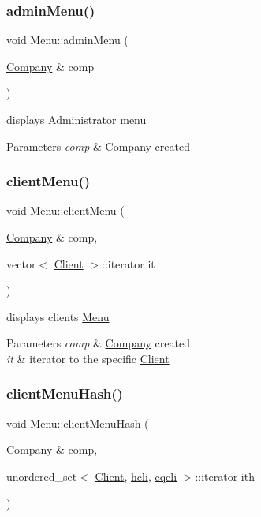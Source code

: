 \subsubsection{\texorpdfstring{admin\+Menu()}{adminMenu()}}
{\footnotesize\ttfamily void Menu\+::admin\+Menu (\begin{DoxyParamCaption}\item[{\hyperlink{class_company}{Company} \&}]{comp }\end{DoxyParamCaption})}



displays Administrator menu 


\begin{DoxyParams}{Parameters}
{\em comp} & \hyperlink{class_company}{Company} created \\
\hline
\end{DoxyParams}
\hypertarget{class_menu_a84baff6bb52d20d742d5d750fad6750d}{}\label{class_menu_a84baff6bb52d20d742d5d750fad6750d} 
\subsubsection{\texorpdfstring{client\+Menu()}{clientMenu()}}
{\footnotesize\ttfamily void Menu\+::client\+Menu (\begin{DoxyParamCaption}\item[{\hyperlink{class_company}{Company} \&}]{comp,  }\item[{vector$<$ \hyperlink{class_client}{Client} $>$\+::iterator}]{it }\end{DoxyParamCaption})}



displays clients \hyperlink{class_menu}{Menu} 


\begin{DoxyParams}{Parameters}
{\em comp} & \hyperlink{class_company}{Company} created\\
\hline
{\em it} & iterator to the specific \hyperlink{class_client}{Client} \\
\hline
\end{DoxyParams}
\hypertarget{class_menu_aa69e8ebe9ec9d077de45860e46a5fcbc}{}\label{class_menu_aa69e8ebe9ec9d077de45860e46a5fcbc} 
\subsubsection{\texorpdfstring{client\+Menu\+Hash()}{clientMenuHash()}}
{\footnotesize\ttfamily void Menu\+::client\+Menu\+Hash (\begin{DoxyParamCaption}\item[{\hyperlink{class_company}{Company} \&}]{comp,  }\item[{unordered\+\_\+set$<$ \hyperlink{class_client}{Client}, \hyperlink{structhcli}{hcli}, \hyperlink{structeqcli}{eqcli} $>$\+::iterator}]{ith }\end{DoxyParamCaption})}



